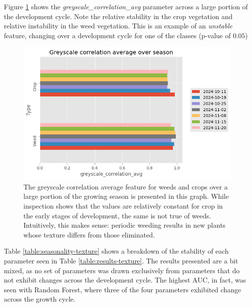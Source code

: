 \documentclass[letterpaper, notitlepage]{report}
\begin{document}
Figure \ref{fig:season-texture-correlation} shows the \textit{greyscale\_correlation\_avg} parameter across a large portion of the development cycle. Note the relative stability in the crop vegetation and relative instability in the weed vegetation. This is an example of an \textit{unstable} feature, changing over a development cycle for one of the classes (p-value of $0.05$)


\begin{figure}[H]
	\centering
	\includegraphics[width=12cm]{./figures/plot-over-season.png}
	\caption[Greyscale Correlation Average over growing season]{The greyscale correlation average feature for weeds and crops over a large portion of the growing season is presented in this graph. While inspection shows that the values are relatively constant for crop in the early stages of development, the same is not true of weeds. Intuitively, this makes sense: periodic weeding results in new plants whose texture differs from those eliminated.}
	\label{fig:season-texture-correlation}
\end{figure}
 
 Table \ref{table:seasonality-texture} shows a breakdown of the stability of each parameter seen in Table \ref{table:results-texture}. The results presented are a bit mixed, as no set of parameters was drawn exclusively from parameters that do not exhibit changes across the development cycle. The highest AUC, in fact, was seen with Random Forest, where three of the four parameters exhibited change across the growth cycle.
 
 {
\renewcommand{\arraystretch}{1.2}




}
\end{document}
